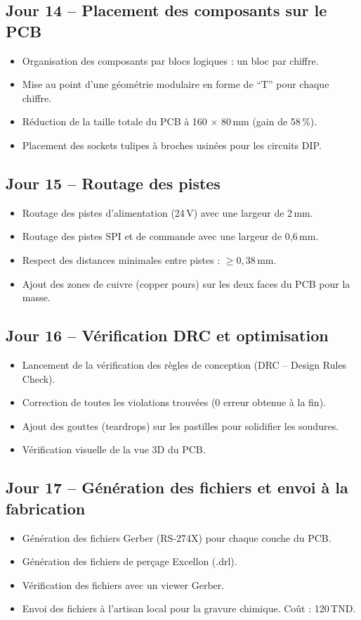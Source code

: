 \documentclass[12pt,a4paper]{article}
\begin{document}
\subsection*{Jour 14 -- Placement des composants sur le PCB}
\begin{itemize}
    \item Organisation des composants par blocs logiques : un bloc par chiffre.
    \item Mise au point d'une géométrie modulaire en forme de ``T'' pour chaque chiffre.
    \item Réduction de la taille totale du PCB à 160 × 80\,mm (gain de 58\,\%).
    \item Placement des sockets tulipes à broches usinées pour les circuits DIP.
\end{itemize}

\subsection*{Jour 15 -- Routage des pistes}
\begin{itemize}
    \item Routage des pistes d'alimentation (24\,V) avec une largeur de 2\,mm.
    \item Routage des pistes SPI et de commande avec une largeur de 0,6\,mm.
    \item Respect des distances minimales entre pistes : $\geq 0{,}38$\,mm.
    \item Ajout des zones de cuivre (copper pours) sur les deux faces du PCB pour la masse.
\end{itemize}

\subsection*{Jour 16 -- Vérification DRC et optimisation}
\begin{itemize}
    \item Lancement de la vérification des règles de conception (DRC -- Design Rules Check).
    \item Correction de toutes les violations trouvées (0 erreur obtenue à la fin).
    \item Ajout des gouttes (teardrops) sur les pastilles pour solidifier les soudures.
    \item Vérification visuelle de la vue 3D du PCB.
\end{itemize}

\subsection*{Jour 17 -- Génération des fichiers et envoi à la fabrication}
\begin{itemize}
    \item Génération des fichiers Gerber (RS-274X) pour chaque couche du PCB.
    \item Génération des fichiers de perçage Excellon (.drl).
    \item Vérification des fichiers avec un viewer Gerber.
    \item Envoi des fichiers à l'artisan local pour la gravure chimique. Coût : 120\,TND.
\end{itemize}
\end{document}
